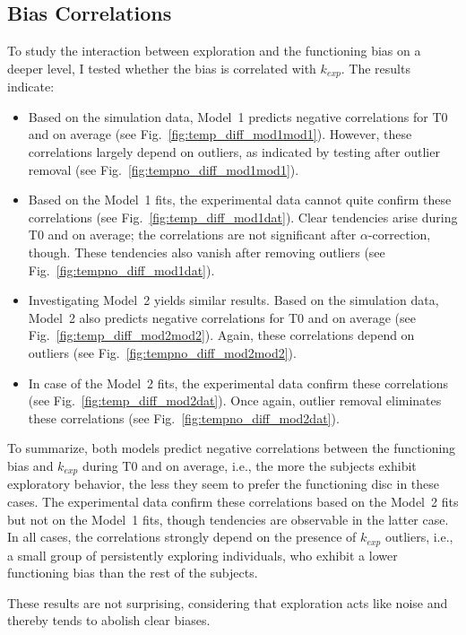 \documentclass[a4paper]{scrreprt}
\begin{document}
\clearpage

\subsection{Bias Correlations}
\label{sec:exploration_bias_correlations}

To study the interaction between exploration and the functioning bias on a deeper level, I tested whether the bias is correlated with $k_{exp}$. The results indicate:
\begin{itemize}
\item Based on the simulation data, Model~1 predicts negative correlations for T0 and on average (see Fig.~\ref{fig:temp_diff_mod1mod1}). However, these correlations largely depend on outliers, as indicated by testing after outlier removal (see Fig.~\ref{fig:tempno_diff_mod1mod1}).
\item Based on the Model~1 fits, the experimental data cannot quite confirm these correlations (see Fig.~\ref{fig:temp_diff_mod1dat}). Clear tendencies arise during T0 and on average; the correlations are not significant after $\alpha$-correction, though. These tendencies also vanish after removing outliers (see Fig.~\ref{fig:tempno_diff_mod1dat}).
\item Investigating Model~2 yields similar results. Based on the simulation data, Model~2 also predicts negative correlations for T0 and on average (see Fig.~\ref{fig:temp_diff_mod2mod2}). Again, these correlations depend on outliers (see Fig.~\ref{fig:tempno_diff_mod2mod2}).
\item In case of the Model~2 fits, the experimental data confirm these correlations (see Fig.~\ref{fig:temp_diff_mod2dat}). Once again, outlier removal eliminates these correlations (see Fig.~\ref{fig:tempno_diff_mod2dat}).
\end{itemize}
To summarize, both models predict negative correlations between the functioning bias and $k_{exp}$ during T0 and on average, i.e., the more the subjects exhibit exploratory behavior, the less they seem to prefer the functioning disc in these cases. The experimental data confirm these correlations based on the Model~2 fits but not on the Model~1 fits, though tendencies are observable in the latter case. In all cases, the correlations strongly depend on the presence of $k_{exp}$ outliers, i.e., a small group of persistently exploring individuals, who exhibit a lower functioning bias than the rest of the subjects.

These results are not surprising, considering that exploration acts like noise and thereby tends to abolish clear biases.
\end{document}
